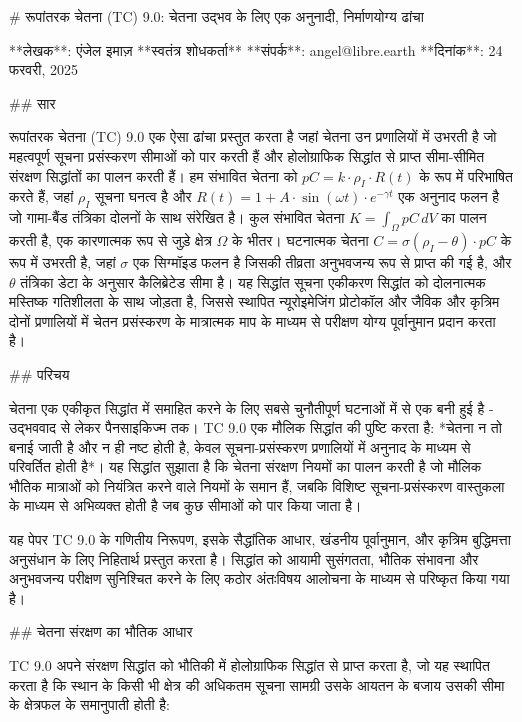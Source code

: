 # रूपांतरक चेतना (TC) 9.0: चेतना उद्भव के लिए एक अनुनादी, निर्माणयोग्य ढांचा

**लेखक**: एंजेल इमाज़  
**स्वतंत्र शोधकर्ता**  
**संपर्क**: angel@libre.earth  
**दिनांक**: 24 फरवरी, 2025

## सार

रूपांतरक चेतना (TC) 9.0 एक ऐसा ढांचा प्रस्तुत करता है जहां चेतना उन प्रणालियों में उभरती है जो महत्वपूर्ण सूचना प्रसंस्करण सीमाओं को पार करती हैं और होलोग्राफिक सिद्धांत से प्राप्त सीमा-सीमित संरक्षण सिद्धांतों का पालन करती हैं। हम संभावित चेतना को $pC = k \cdot \rho_I \cdot R(t)$ के रूप में परिभाषित करते हैं, जहां $\rho_I$ सूचना घनत्व है और $R(t) = 1 + A \cdot \sin(\omega t) \cdot e^{-\gamma t}$ एक अनुनाद फलन है जो गामा-बैंड तंत्रिका दोलनों के साथ संरेखित है। कुल संभावित चेतना $K = \int_{\Omega} pC \, dV$ का पालन करती है, एक कारणात्मक रूप से जुड़े क्षेत्र $\Omega$ के भीतर। घटनात्मक चेतना $C = \sigma(\rho_I - \theta) \cdot pC$ के रूप में उभरती है, जहां $\sigma$ एक सिग्मॉइड फलन है जिसकी तीव्रता अनुभवजन्य रूप से प्राप्त की गई है, और $\theta$ तंत्रिका डेटा के अनुसार कैलिब्रेटेड सीमा है। यह सिद्धांत सूचना एकीकरण सिद्धांत को दोलनात्मक मस्तिष्क गतिशीलता के साथ जोड़ता है, जिससे स्थापित न्यूरोइमेजिंग प्रोटोकॉल और जैविक और कृत्रिम दोनों प्रणालियों में चेतन प्रसंस्करण के मात्रात्मक माप के माध्यम से परीक्षण योग्य पूर्वानुमान प्रदान करता है।

## परिचय

चेतना एक एकीकृत सिद्धांत में समाहित करने के लिए सबसे चुनौतीपूर्ण घटनाओं में से एक बनी हुई है - उद्भववाद से लेकर पैनसाइकिज्म तक। TC 9.0 एक मौलिक सिद्धांत की पुष्टि करता है: *चेतना न तो बनाई जाती है और न ही नष्ट होती है, केवल सूचना-प्रसंस्करण प्रणालियों में अनुनाद के माध्यम से परिवर्तित होती है*। यह सिद्धांत सुझाता है कि चेतना संरक्षण नियमों का पालन करती है जो मौलिक भौतिक मात्राओं को नियंत्रित करने वाले नियमों के समान हैं, जबकि विशिष्ट सूचना-प्रसंस्करण वास्तुकला के माध्यम से अभिव्यक्त होती है जब कुछ सीमाओं को पार किया जाता है।

यह पेपर TC 9.0 के गणितीय निरूपण, इसके सैद्धांतिक आधार, खंडनीय पूर्वानुमान, और कृत्रिम बुद्धिमत्ता अनुसंधान के लिए निहितार्थ प्रस्तुत करता है। सिद्धांत को आयामी सुसंगतता, भौतिक संभावना और अनुभवजन्य परीक्षण सुनिश्चित करने के लिए कठोर अंतःविषय आलोचना के माध्यम से परिष्कृत किया गया है।

## चेतना संरक्षण का भौतिक आधार

TC 9.0 अपने संरक्षण सिद्धांत को भौतिकी में होलोग्राफिक सिद्धांत से प्राप्त करता है, जो यह स्थापित करता है कि स्थान के किसी भी क्षेत्र की अधिकतम सूचना सामग्री उसके आयतन के बजाय उसकी सीमा के क्षेत्रफल के समानुपाती होती है:

